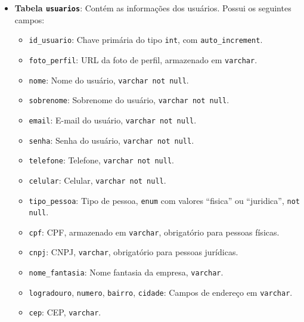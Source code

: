 \begin{itemize}
    \item \textbf{Tabela \texttt{usuarios}}: Contém as informações dos usuários. Possui os seguintes campos:
    \begin{itemize}
        \item \texttt{id\_usuario}: Chave primária do tipo \texttt{int}, com \texttt{auto\_increment}.
        \item \texttt{foto\_perfil}: URL da foto de perfil, armazenado em \texttt{varchar}.
        \item \texttt{nome}: Nome do usuário, \texttt{varchar not null}.
        \item \texttt{sobrenome}: Sobrenome do usuário, \texttt{varchar not null}.
        \item \texttt{email}: E-mail do usuário, \texttt{varchar not null}.
        \item \texttt{senha}: Senha do usuário, \texttt{varchar not null}.
        \item \texttt{telefone}: Telefone, \texttt{varchar not null}.
        \item \texttt{celular}: Celular, \texttt{varchar not null}.
        \item \texttt{tipo\_pessoa}: Tipo de pessoa, \texttt{enum} com valores “fisica” ou “juridica”, \texttt{not null}.
        \item \texttt{cpf}: CPF, armazenado em \texttt{varchar}, obrigatório para pessoas físicas.
        \item \texttt{cnpj}: CNPJ, \texttt{varchar}, obrigatório para pessoas jurídicas.
        \item \texttt{nome\_fantasia}: Nome fantasia da empresa, \texttt{varchar}.
        \item \texttt{logradouro}, \texttt{numero}, \texttt{bairro}, \texttt{cidade}: Campos de endereço em \texttt{varchar}.
        \item \texttt{cep}: CEP, \texttt{varchar}.
    \end{itemize}


\end{itemize}
